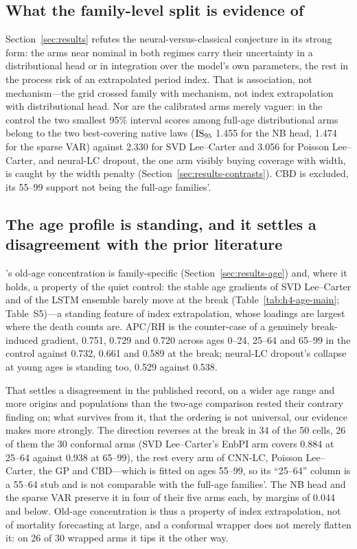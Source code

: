 \subsection{What the family-level split is evidence of}
\label{sec:discussion-split}

Section~\ref{sec:results} refutes the neural-versus-classical conjecture in its
strong form: the arms near nominal in both regimes carry their uncertainty in a
distributional head or in integration over the model's own parameters, the rest
in the process risk of an extrapolated period index. That is association, not
mechanism---the grid crossed family with mechanism, not index extrapolation
with distributional head. Nor are the calibrated arms merely vaguer: in the
control the two smallest 95\% interval scores among full-age distributional
arms belong to the two best-covering native laws ($\operatorname{IS}_{95}$ 1.455 for the NB
head, 1.474 for the sparse VAR) against 2.330 for SVD Lee--Carter and 3.056 for
Poisson Lee--Carter, and neural-LC dropout, the one arm visibly buying coverage
with width, is caught by the width penalty
(Section~\ref{sec:results-contrasts}). CBD is excluded, its 55--99 support not
being the full-age families'.

\subsection{The age profile is standing, and it settles a disagreement with the prior literature}
\label{sec:discussion-age}

\Hfour's old-age concentration is family-specific
(Section~\ref{sec:results-age}) and, where it holds, a property of the quiet
control: the stable age gradients of SVD Lee--Carter and of the LSTM ensemble
barely move at the break (Table~\ref{tab:h4-age-main}; Table~S5)---a standing
feature of index extrapolation, whose loadings are largest where the death
counts are. APC/RH is the counter-case of a genuinely break-induced gradient,
0.751, 0.729 and 0.720 across ages 0--24, 25--64 and 65--99 in the control
against 0.732, 0.661 and 0.589 at the break; neural-LC dropout's collapse at
young ages is standing too, 0.529 against 0.538.

That settles a disagreement in the published record, on a wider age range and
more origins and populations than the two-age comparison
\citet{dowd2010backtesting} rested their contrary finding on; what survives
from it, that the ordering is not universal, our evidence makes more strongly.
The direction reverses at the break in 34 of the 50 cells, 26 of them the 30
conformal arms (SVD Lee--Carter's EnbPI arm covers 0.884 at 25--64 against
0.938 at 65--99), the rest every arm of CNN-LC, Poisson Lee--Carter, the GP and
CBD---which is fitted on ages 55--99, so its ``25--64'' column is a 55--64 stub
and is not comparable with the full-age families'. The NB head and the sparse
VAR preserve it in four of their five arms each, by margins of 0.044 and below.
Old-age concentration is thus a property of index extrapolation, not of
mortality forecasting at large, and a conformal wrapper does not merely flatten
it: on 26 of 30 wrapped arms it tips it the other way.

